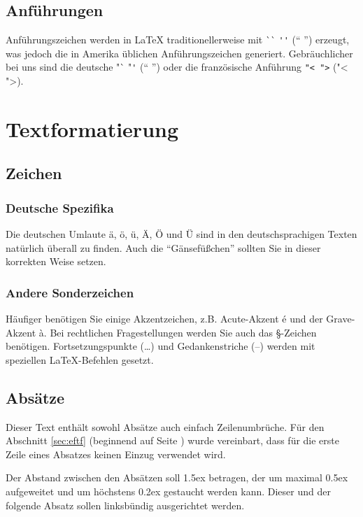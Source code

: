\documentclass[11pt, a4paper,draft]{article}
\newcommand{\ltx}{\LaTeX}
\begin{document}
\subsection{Anführungen}
Anführungszeichen werden in \ltx{} traditionellerweise mit \`{}\`{} \verb+''+ (`` '') erzeugt, was jedoch die in Amerika üblichen Anführungszeichen generiert. Gebräuchlicher bei uns sind die deutsche "\`{} "\verb+'+ ("` "') oder die französische Anführung \verb+"< ">+ ("< ">).

\begingroup
\setlength{\parindent}{0pt}
\setlength{\parskip}{1.5ex plus 0.5ex minus 0.2ex}
\section{Textformatierung\label{sec:eftf}}

\subsection{Zeichen}

\subsubsection{Deutsche Spezifika}
Die deutschen Umlaute ä, ö, ü, Ä, Ö und Ü sind in den deutschsprachigen Texten natürlich überall zu finden. Auch die "`Gänsefü\ss chen"' sollten Sie in dieser korrekten Weise setzen.

\subsubsection{Andere Sonderzeichen}
Häufiger benötigen Sie einige Akzentzeichen, z.B. Acute-Akzent é und der Grave-Akzent à. Bei rechtlichen Fragestellungen werden Sie auch das §-Zeichen benötigen. Fortsetzungspunkte (\dots) und Gedankenstriche (--) werden mit speziellen \ltx-Befehlen gesetzt.

\subsection{Absätze}
Dieser Text enthält sowohl Absätze auch einfach Zeilenumbrüche. Für den Abschnitt \ref{sec:eftf} (beginnend auf Seite \pageref{sec:eftf}) wurde vereinbart, dass für die erste Zeile eines Absatzes keinen Einzug verwendet wird.

\begingroup
\raggedright %
Der Abstand zwischen den Absätzen soll 1.5ex betragen, der um maximal 0.5ex aufgeweitet und um höchstens 0.2ex gestaucht werden kann. Dieser und der folgende Absatz sollen linksbündig ausgerichtet werden.
\end{document}
